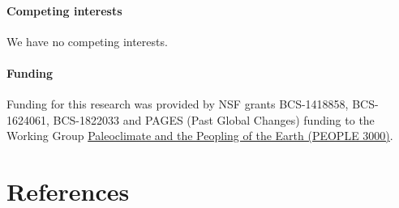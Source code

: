 \documentclass[
]{article}
\begin{document}
\hypertarget{competing-interests}{%
\paragraph*{Competing interests}\label{competing-interests}}

We have no competing interests.

\hypertarget{funding}{%
\paragraph*{Funding}\label{funding}}

Funding for this research was provided by NSF grants BCS-1418858, BCS-1624061, BCS-1822033 and PAGES (Past Global Changes) funding to the Working Group \href{http://www.pastglobalchanges.org/ini/wg/arctic2k/170-initiatives/working-group/people-3000/1732-people-3000}{Paleoclimate and the Peopling of the Earth (PEOPLE 3000)}.

\newpage

\hypertarget{references}{%
\section*{References}\label{references}}
\end{document}
